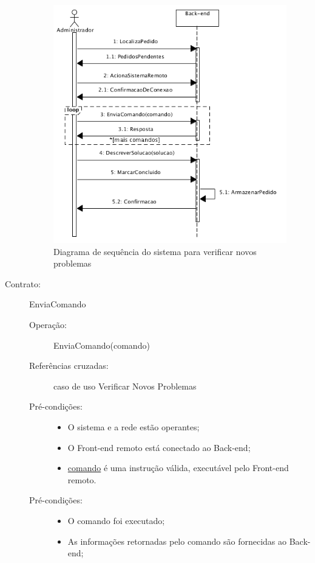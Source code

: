 \documentclass[brazil,times]{abnt}
\begin{document}
\begin{description}
\begin{figure}[htp]
\begin{center}
  \includegraphics[scale=0.65]{diagramas/diagramaDeSequenciaProblema.png}
  \caption[Diagrama de sequência do sistema para verificar novos problemas
  ]{Diagrama de sequência do sistema para verificar novos problemas}
  \label{diagrama-sequencia-problema}
\end{center}
\end{figure}
\item[Contrato:] EnviaComando
\begin{description}
  \item[Operação:] EnviaComando(comando)
  \item[Referências cruzadas:] caso de uso Verificar Novos Problemas
  \item[Pré-condições:] \hfill
  	\begin{itemize}
  		\item O sistema e a rede estão operantes;
  		\item O Front-end remoto está conectado ao Back-end;
  		\item \underline{comando} é uma instrução válida, executável pelo Front-end
  		remoto.
	\end{itemize}
  \item[Pré-condições:] \hfill
  	\begin{itemize}
  		\item O comando foi executado;
  		\item As informações retornadas pelo comando são fornecidas ao Back-end;
	\end{itemize}
\end{description}

\end{description}
\end{document}
